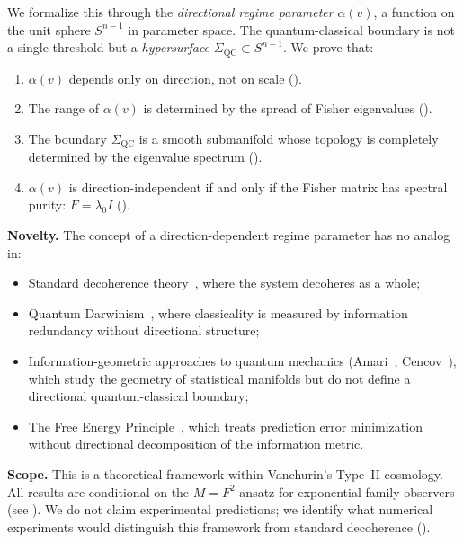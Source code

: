 \documentclass[11pt,a4paper]{article}
\theoremstyle{plain}
\theoremstyle{definition}
\newcommand{\Sn}{S^{n-1}}
\newcommand{\SigmaQC}{\Sigma_{\mathrm{QC}}}
\begin{document}
We formalize this through the \emph{directional regime parameter}
$\alpha(v)$, a function on the unit sphere $\Sn$ in parameter space.
The quantum-classical boundary is not a single threshold but a
\emph{hypersurface} $\SigmaQC \subset \Sn$.  We prove that:
\begin{enumerate}[noitemsep]
\item $\alpha(v)$ depends only on direction, not on scale
      ().
\item The range of $\alpha(v)$ is determined by the spread of Fisher
      eigenvalues ().
\item The boundary $\SigmaQC$ is a smooth submanifold whose topology
      is completely determined by the eigenvalue spectrum
      ().
\item $\alpha(v)$ is direction-independent if and only if the Fisher
      matrix has spectral purity: $F = \lambda_0 I$
      ().
\end{enumerate}

\textbf{Novelty.}  The concept of a direction-dependent regime
parameter has no analog in:
\begin{itemize}[noitemsep]
\item Standard decoherence theory~\cite{zurek2003decoherence}, where
      the system decoheres as a whole;
\item Quantum Darwinism~\cite{zurek2009quantum}, where classicality
      is measured by information redundancy without directional
      structure;
\item Information-geometric approaches to quantum mechanics
      (Amari~\cite{amari1985differential, amari2016information},
      Cencov~\cite{cencov1982statistical}), which study the geometry
      of statistical manifolds but do not define a directional
      quantum-classical boundary;
\item The Free Energy Principle~\cite{friston2010free}, which
      treats prediction error minimization without directional
      decomposition of the information metric.
\end{itemize}

\textbf{Scope.}  This is a theoretical framework within Vanchurin's
Type~II cosmology.  All results are conditional on the $M = F^2$
ansatz for exponential family observers (see ).
We do not claim experimental predictions; we identify what
numerical experiments would distinguish this framework from
standard decoherence ().
\end{document}
